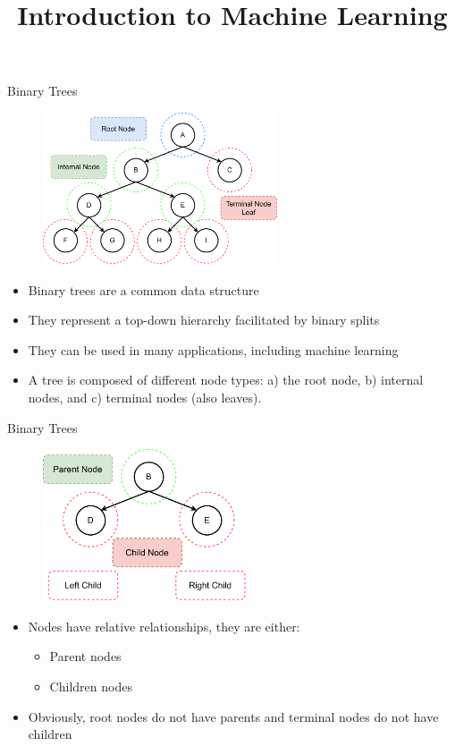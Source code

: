 \documentclass[11pt,compress,t,notes=noshow, xcolor=table]{beamer}
\title{Introduction to Machine Learning}
\institute{\href{https://compstat-lmu.github.io/lecture_i2ml/}{compstat-lmu.github.io/lecture\_i2ml}}
\date{}
\begin{document}
\sloppy

\begin{vbframe}{Binary Trees}
    \begin{figure}
    \centering
      \includegraphics[height = 4.5cm, keepaspectratio]{figure/cart_intro_binary-tree_1.pdf}
    \end{figure}
  \begin{itemize}
    \item Binary trees are a common data structure
    \item They represent a top-down hierarchy facilitated by binary splits
    \item They can be used in many applications, including machine learning
    \item A tree is composed of different node types: a) the root node, b) internal nodes, and c) terminal nodes (also leaves).
  \end{itemize}
\end{vbframe}

\begin{vbframe}{Binary Trees}
    \begin{figure}
    \centering
      \includegraphics[height = 4.5cm, keepaspectratio]{figure/cart_intro_binary-tree_2.pdf}
    \end{figure}
  \begin{itemize}
    \item Nodes have relative relationships, they are either:
    \begin{itemize}
    \item Parent nodes
    \item Children nodes
    \end{itemize}
    \item Obviously, root nodes do not have parents and terminal nodes do not have children
  \end{itemize}
\end{vbframe}
\end{document}
